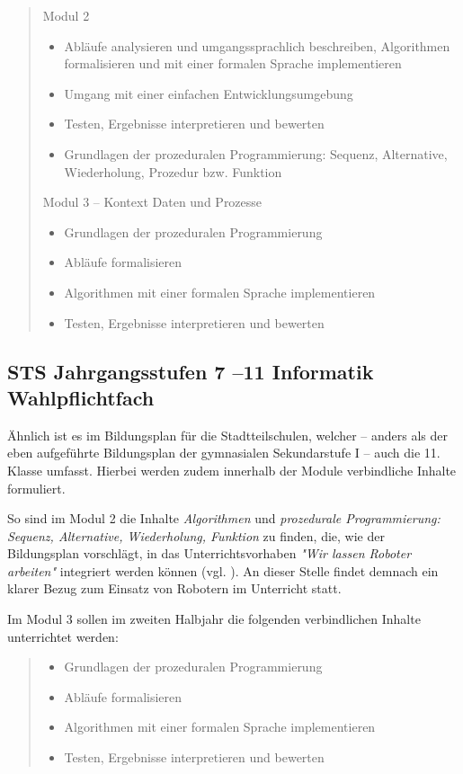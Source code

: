 \documentclass[paper=a4, DIV=calc, BCOR=12mm, twoside=on, onecolumn=on, open = right, titlepage =on, parskip =half-, headsepline = on, footsepline = off, chapterprefix = off, appendixprefix = on, fontsize = 12pt, numbers = noenddot, abstract = on]{scrbook}
\begin{document}
 \begin{quote}
Modul 2
\begin{itemize}
\item Abläufe analysieren und umgangssprachlich beschreiben, Algorithmen formalisieren und mit einer formalen Sprache implementieren
\item Umgang mit einer einfachen Entwicklungsumgebung
\item Testen, Ergebnisse interpretieren und bewerten
\item Grundlagen der prozeduralen Programmierung: Sequenz, Alternative, Wiederholung, Prozedur bzw. Funktion
\end{itemize}

Modul 3 -- Kontext Daten und Prozesse
\begin{itemize}
\item Grundlagen der prozeduralen Programmierung
\item Abläufe formalisieren
\item Algorithmen mit einer formalen Sprache implementieren
\item Testen, Ergebnisse interpretieren und bewerten \hfill \cite{gymsek1:11} 
\end{itemize}
 \end{quote}


\subsection{STS Jahrgangsstufen 7 --11 Informatik Wahlpflichtfach}
Ähnlich ist es im Bildungsplan für die Stadtteilschulen, welcher -- anders als der eben aufgeführte Bildungsplan der gymnasialen Sekundarstufe I -- auch die 11. Klasse umfasst. Hierbei werden zudem innerhalb der Module verbindliche Inhalte formuliert.

So sind im Modul 2 die Inhalte \emph{Algorithmen} und \emph{prozedurale Programmierung: Sequenz, Alternative, Wiederholung, Funktion} zu finden, die, wie der Bildungsplan vorschlägt, in das Unterrichtsvorhaben \emph{"Wir lassen Roboter arbeiten"} integriert werden können (vgl. \cite{stsmittel:14}). An dieser Stelle findet demnach ein klarer Bezug zum Einsatz von Robotern im Unterricht statt.

Im Modul 3 sollen im zweiten Halbjahr die folgenden verbindlichen Inhalte unterrichtet werden:
\begin{quote}
\begin{itemize}
\item Grundlagen der prozeduralen Programmierung
\item Abläufe formalisieren
\item Algorithmen mit einer formalen Sprache implementieren
\item Testen, Ergebnisse interpretieren und bewerten \hfill \cite{stsmittel:14}
\end{itemize}
\end{quote}
\end{document}
